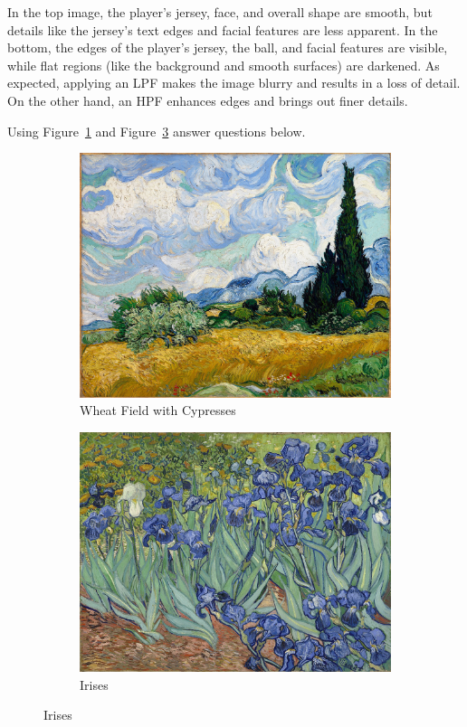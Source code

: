 \documentclass[hidelinks,12pt]{article}
\begin{document}
	
	  In the top image, the player's jersey, face, and overall shape are smooth, but details like the jersey's text edges and facial features are less apparent. In the bottom, the edges of the player's jersey, the ball, and facial features are visible, while flat regions (like the background and smooth surfaces) are darkened. As expected, applying an LPF makes the image blurry and results in a loss of detail. On the other hand, an HPF enhances edges and brings out finer details.
	
	\pagebreak
	
	
	 Using Figure~\textcolor{Cyan}{\ref{fig:pic2}} and Figure~\textcolor{Cyan}{\ref{fig:pic3}} answer questions below.
	
	
	\begin{figure}[h]
		\centering
		\begin{subfigure}{0.45\textwidth}
			\centering
			\includegraphics[width=\linewidth]{figures/pic2.jpg}
			\caption{Wheat Field with Cypresses}
			\label{fig:pic2}
		\end{subfigure}
		\hfill
		\begin{subfigure}{0.45\textwidth}
			\centering
			\includegraphics[width=\linewidth]{figures/pic3.jpg}
			\caption{Irises}
			\label{fig:pic3}
		\end{subfigure}
	\end{figure}
	
\end{document}
